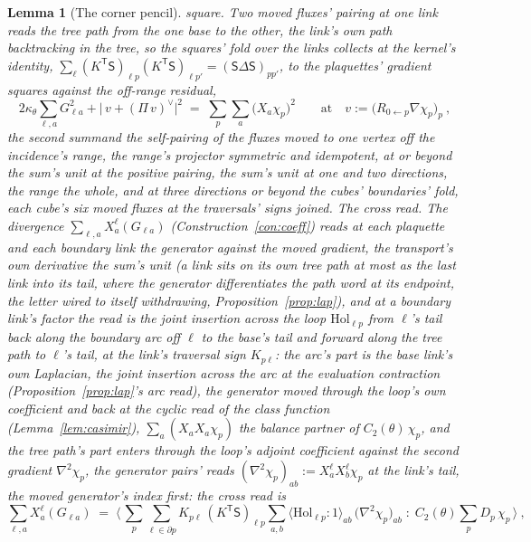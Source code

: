 \documentclass[11pt]{article}
\newtheorem{lemma}{Lemma}
\theoremstyle{definition}
\begin{document}
\begin{lemma}[The corner pencil]
{square.} Two moved fluxes' pairing at one link reads the tree path
from the one base to the other, the link's own path backtracking
in the tree, so the squares' fold over the links collects at the
kernel's identity, $\sum_\ell(K^{\mathsf T}\mathsf S)_{\ell p}
(K^{\mathsf T}\mathsf S)_{\ell p'}=(\mathsf S\Delta\mathsf S)_{pp'}$,
to the plaquettes' gradient squares against the off-range residual,
\[
2\kappa_\theta\sum_{\ell,a}G_{\ell a}^{2}
+\big|\,v+(\Pi\,v)^{\!\vee}\big|^{2}
\;=\;\sum_p\sum_a\big(X_a\chi_p\big)^{2}
\qquad\text{at}\quad v:=\big(R_{0\leftarrow p}\nabla\chi_p\big)_p\ ,
\]
the second summand the self-pairing of the fluxes moved to one
vertex off the incidence's range, the range's projector symmetric
and idempotent, at or beyond the sum's unit at the positive pairing,
the sum's unit at one and two directions, the range the whole, and
at three directions or beyond the cubes' boundaries' fold, each
cube's six moved fluxes at the traversals' signs joined. \emph{The cross
read.} The divergence $\sum_{\ell,a}X_a^{\ell}(G_{\ell a})$
(Construction~\ref{con:coeff}) reads at each plaquette and each
boundary link the generator against the moved gradient, the
transport's own derivative the sum's unit (a link sits on its own
tree path at most as the last link into its tail, where the
generator differentiates the path word at its endpoint, the letter
wired to itself withdrawing, Proposition~\ref{prop:lap}), and at a
boundary link's factor the read is the joint insertion across the
\emph{loop} $\mathrm{Hol}_{\ell p}$ from $\ell$'s tail back along
the boundary arc off $\ell$ to the base's tail and forward along the
tree path to $\ell$'s tail, at the link's traversal sign
$K_{p\ell}$: the arc's part is the base link's own Laplacian, the
joint insertion across the arc at the evaluation contraction
(Proposition~\ref{prop:lap}'s arc read), the generator moved through
the loop's own coefficient and back at the cyclic read of the class
function (Lemma~\ref{lem:casimir}), $\sum_a(X_aX_a\chi_p)$ the
balance partner of $C_2(\theta)\,\chi_p$, and the tree path's part
enters through the loop's adjoint coefficient against the
\emph{second gradient} $\nabla^{2}\chi_p$, the generator pairs'
reads $(\nabla^{2}\chi_p)_{ab}:=X_a^{\ell}X_b^{\ell}\chi_p$ at the
link's tail, the moved generator's index first: the cross read is
\[
\sum_{\ell,a}X_a^{\ell}(G_{\ell a})
\;=\;\Big\langle\,\sum_p\sum_{\ell\in\partial p}
K_{p\ell}\,(K^{\mathsf T}\mathsf S)_{\ell p}\sum_{a,b}
\big\langle\mathrm{Hol}_{\ell p}\!:\!1\big\rangle_{ab}\,
\big(\nabla^{2}\chi_p\big)_{ab}
\;:\;C_2(\theta)\sum_pD_p\,\chi_p\,\Big\rangle\ ,
\]
\end{lemma}
\end{document}
